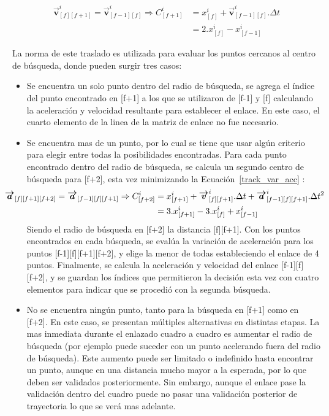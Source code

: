 \begin{equation}
\begin{split}
\boldsymbol{\overrightarrow{v}}_{[f][f+1]}^{i} = \boldsymbol{\overrightarrow{v}}_{[f-1][f]}^{i} \Rightarrow C_{[f+1]}^{i} &= x_{[f]}^{i} + \boldsymbol{\overrightarrow{v}}_{[f-1][f]}^{i}.\Delta{t} \\
&= 2.x_{[f]}^{i} -x_{[f-1]}^{i} 
\end{split}
\label{centro_busqueda_f1}
\end{equation}

La norma de este traslado es utilizada para evaluar los puntos cercanos al centro de búsqueda, donde pueden surgir tres casos:

\begin{itemize}
\item Se encuentra un solo punto dentro del radio de búsqueda, se agrega el índice del punto encontrado en [f+1] a los que se utilizaron de [f-1] y [f] calculando la aceleración y velocidad resultante para establecer el enlace. En este caso, el cuarto elemento de la linea de la matriz de enlace no fue necesario.
\item Se encuentra mas de un punto, por lo cual se tiene que usar algún criterio para elegir entre todas la posibilidades encontradas. Para cada punto encontrado dentro del radio de búsqueda, se calcula un segundo centro de búsqueda para [f+2], esta vez minimizando la Ecuación~\ref{track_var_acc} :
\begin{equation}
\hspace{-1cm}
\begin{split}
\boldsymbol{\overrightarrow{a}}_{[f][f+1][f+2]}=\boldsymbol{\overrightarrow{a}}_{[f-1][f][f+1]} \Rightarrow C_{[f+2]}^{i} &= x_{[f+1]}^{i} + \boldsymbol{\overrightarrow{v}}_{[f][f+1]}^{i}.\Delta{t} + \boldsymbol{\overrightarrow{a}}_{[f-1][f][f+1]}^{i}.\Delta{t}^2\\
&= 3.x_{[f+1]}^{i} - 3.x_{[f]}^{i} + x_{[f-1]}^{i}\end{split}
\label{centro_busqueda_f2}
\end{equation}
Siendo el radio de búsqueda en [f+2] la distancia [f][f+1]. Con los puntos encontrados en cada búsqueda, se evalúa la variación de aceleración para los puntos [f-1][f][f+1][f+2], y elige la menor de todas estableciendo el enlace de 4 puntos. Finalmente, se calcula la aceleración y velocidad del enlace [f-1][f][f+2], y se guardan los índices que permitieron la decisión esta vez con cuatro elementos para indicar que se procedió con la segunda búsqueda.
\item No se encuentra ningún punto, tanto para la búsqueda en [f+1] como en [f+2]. En este caso, se presentan múltiples alternativas en distintas etapas. La mas inmediata durante el enlazado cuadro a cuadro es aumentar el radio de búsqueda (por ejemplo puede suceder con un punto acelerando fuera del radio de búsqueda). Este aumento puede ser limitado o indefinido hasta encontrar un punto, aunque en una distancia mucho mayor a la esperada, por lo que deben ser validados posteriormente. Sin embargo, aunque el enlace pase la validación dentro del cuadro puede no pasar una validación posterior de trayectoria lo que se verá mas adelante.
\end{itemize}

